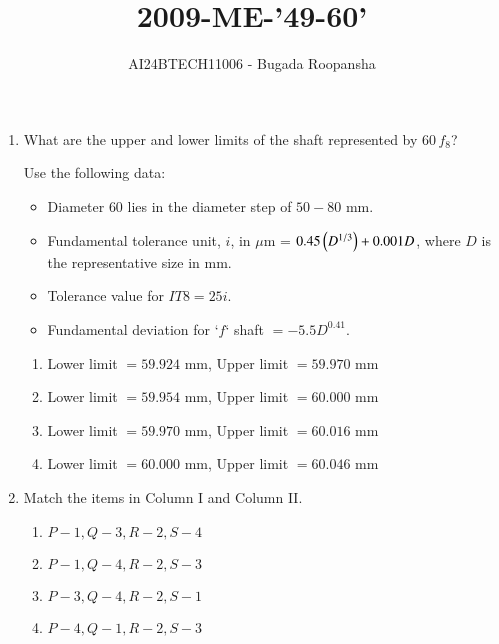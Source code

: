 \documentclass[journal,12pt,twocolumn]{IEEEtran}
\theoremstyle{remark}
\begin{document}
                        
                        \vspace{3cm}
                        \title{2009-ME-'49-60'}
                        \author{AI24BTECH11006 - Bugada Roopansha}
                        \maketitle
                        \begin{enumerate}[start=49]
 \item What are the upper and lower limits of the shaft represented by $60 \, f_8$?
    
    Use the following data:
    \begin{itemize}
        \item Diameter $60$ lies in the diameter step of $50 - 80$ mm.
        \item Fundamental tolerance unit, $i$, in $\mu$m = $0.45 \left(D^{1/3}\right) + 0.001 D$, where $D$ is the representative size in mm.
        \item Tolerance value for $IT8 = 25i$.
        \item Fundamental deviation for `$f$` shaft $= -5.5 D^{0.41}$.
    \end{itemize}
    
    \begin{enumerate}
        \item Lower limit $= 59.924$ mm, Upper limit $= 59.970$ mm
        \item Lower limit $= 59.954$ mm, Upper limit $= 60.000$ mm
        \item Lower limit $= 59.970$ mm, Upper limit $= 60.016$ mm
        \item Lower limit $= 60.000$ mm, Upper limit $= 60.046$ mm
    \end{enumerate}
    
    \item Match the items in Column I and Column II.
    
    
    
    \begin{enumerate}
        \item $P - 1, Q - 3, R - 2, S - 4$
        \item $P - 1, Q - 4, R - 2, S - 3$
        \item $P - 3, Q - 4, R - 2, S - 1$
        \item $P - 4, Q - 1, R - 2, S - 3$
    \end{enumerate}
  


\end{enumerate}
\end{document}
